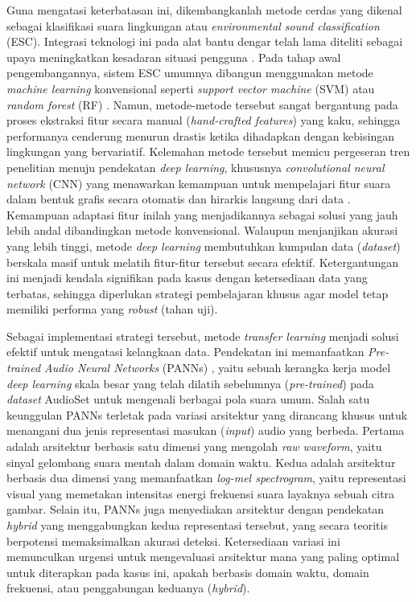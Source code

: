 Guna mengatasi keterbatasan ini, dikembangkanlah metode cerdas yang dikenal sebagai klasifikasi suara lingkungan atau \textit{environmental sound classification} (ESC).
Integrasi teknologi ini pada alat bantu dengar telah lama diteliti sebagai upaya meningkatkan kesadaran situasi pengguna \cite{buchler2005sound}.
Pada tahap awal pengembangannya, sistem ESC umumnya dibangun menggunakan metode \textit{machine learning} konvensional seperti \textit{support vector machine} (SVM) atau \textit{random forest} (RF) \cite{salamon2014dataset}.
Namun, metode-metode tersebut sangat bergantung pada proses ekstraksi fitur secara manual (\textit{hand-crafted features}) yang kaku, sehingga performanya cenderung menurun drastis ketika dihadapkan dengan kebisingan lingkungan yang bervariatif.
Kelemahan metode tersebut memicu pergeseran tren penelitian menuju pendekatan \textit{deep learning}, khususnya \textit{convolutional neural network} (CNN) yang menawarkan kemampuan untuk mempelajari fitur suara dalam bentuk grafis secara otomatis dan hirarkis langsung dari data \cite{piczak2015environmental}. 
Kemampuan adaptasi fitur inilah yang menjadikannya sebagai solusi yang jauh lebih andal dibandingkan metode konvensional. 
Walaupun menjanjikan akurasi yang lebih tinggi, metode \textit{deep learning} membutuhkan kumpulan data (\textit{dataset}) berskala masif untuk melatih fitur-fitur tersebut secara efektif.
Ketergantungan ini menjadi kendala signifikan pada kasus dengan ketersediaan data yang terbatas, sehingga diperlukan strategi pembelajaran khusus agar model tetap memiliki performa yang \textit{robust} (tahan uji). \par

Sebagai implementasi strategi tersebut, metode \textit{transfer learning} menjadi solusi efektif untuk mengatasi kelangkaan data. 
Pendekatan ini memanfaatkan \textit{Pre-trained Audio Neural Networks} (PANNs) \cite{kong2020panns}, yaitu sebuah kerangka kerja model \textit{deep learning} skala besar yang telah dilatih sebelumnya (\textit{pre-trained}) pada \textit{dataset} AudioSet \cite{gemmeke2017audioset} untuk mengenali berbagai pola suara umum. 
Salah satu keunggulan PANNs terletak pada variasi arsitektur yang dirancang khusus untuk menangani dua jenis representasi masukan (\textit{input}) audio yang berbeda.
Pertama adalah arsitektur berbasis satu dimensi yang mengolah \textit{raw waveform}, yaitu sinyal gelombang suara mentah dalam domain waktu.
Kedua adalah arsitektur berbasis dua dimensi yang memanfaatkan \textit{log-mel spectrogram}, yaitu representasi visual yang memetakan intensitas energi frekuensi suara layaknya sebuah citra gambar.
Selain itu, PANNs juga menyediakan arsitektur dengan pendekatan \textit{hybrid} yang menggabungkan kedua representasi tersebut, yang secara teoritis berpotensi memaksimalkan akurasi deteksi.
Ketersediaan variasi ini memunculkan urgensi untuk mengevaluasi arsitektur mana yang paling optimal untuk diterapkan pada kasus ini, apakah berbasis domain waktu, domain frekuensi, atau penggabungan keduanya (\textit{hybrid}). \par

